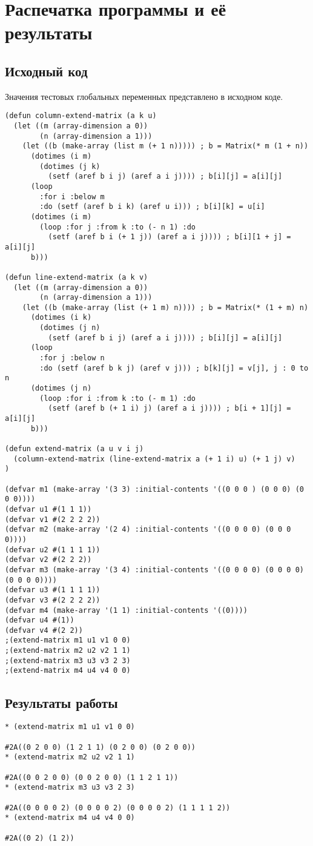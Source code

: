 \documentclass[12pt]{article}
\begin{document}
\section{Распечатка программы и её результаты}

\subsection{Исходный код}
Значения тестовых глобальных переменных представлено в исходном коде.
\begin{verbatim}
(defun column-extend-matrix (a k u)
  (let ((m (array-dimension a 0))
        (n (array-dimension a 1)))
    (let ((b (make-array (list m (+ 1 n))))) ; b = Matrix(* m (1 + n)) 
      (dotimes (i m)
        (dotimes (j k)
          (setf (aref b i j) (aref a i j)))) ; b[i][j] = a[i][j]
      (loop
        :for i :below m
        :do (setf (aref b i k) (aref u i))) ; b[i][k] = u[i]
      (dotimes (i m)
        (loop :for j :from k :to (- n 1) :do 
          (setf (aref b i (+ 1 j)) (aref a i j)))) ; b[i][1 + j] = a[i][j]
      b)))
    
(defun line-extend-matrix (a k v)
  (let ((m (array-dimension a 0))
        (n (array-dimension a 1)))
    (let ((b (make-array (list (+ 1 m) n)))) ; b = Matrix(* (1 + m) n)
      (dotimes (i k)
        (dotimes (j n)
          (setf (aref b i j) (aref a i j)))) ; b[i][j] = a[i][j]
      (loop
        :for j :below n
        :do (setf (aref b k j) (aref v j))) ; b[k][j] = v[j], j : 0 to n
      (dotimes (j n)
        (loop :for i :from k :to (- m 1) :do
          (setf (aref b (+ 1 i) j) (aref a i j)))) ; b[i + 1][j] = a[i][j]
      b)))

(defun extend-matrix (a u v i j)
  (column-extend-matrix (line-extend-matrix a (+ 1 i) u) (+ 1 j) v)
)

(defvar m1 (make-array '(3 3) :initial-contents '((0 0 0 ) (0 0 0) (0 0 0))))
(defvar u1 #(1 1 1))
(defvar v1 #(2 2 2 2))
(defvar m2 (make-array '(2 4) :initial-contents '((0 0 0 0) (0 0 0 0))))
(defvar u2 #(1 1 1 1))
(defvar v2 #(2 2 2))
(defvar m3 (make-array '(3 4) :initial-contents '((0 0 0 0) (0 0 0 0) (0 0 0 0))))
(defvar u3 #(1 1 1 1))
(defvar v3 #(2 2 2 2))
(defvar m4 (make-array '(1 1) :initial-contents '((0))))
(defvar u4 #(1))
(defvar v4 #(2 2))
;(extend-matrix m1 u1 v1 0 0)
;(extend-matrix m2 u2 v2 1 1)
;(extend-matrix m3 u3 v3 2 3)
;(extend-matrix m4 u4 v4 0 0)
\end{verbatim}
%

\subsection{Результаты работы}
\begin{verbatim}
* (extend-matrix m1 u1 v1 0 0)

#2A((0 2 0 0) (1 2 1 1) (0 2 0 0) (0 2 0 0))
* (extend-matrix m2 u2 v2 1 1)

#2A((0 0 2 0 0) (0 0 2 0 0) (1 1 2 1 1))
* (extend-matrix m3 u3 v3 2 3)

#2A((0 0 0 0 2) (0 0 0 0 2) (0 0 0 0 2) (1 1 1 1 2))
* (extend-matrix m4 u4 v4 0 0)

#2A((0 2) (1 2))
\end{verbatim}
%
\end{document}
